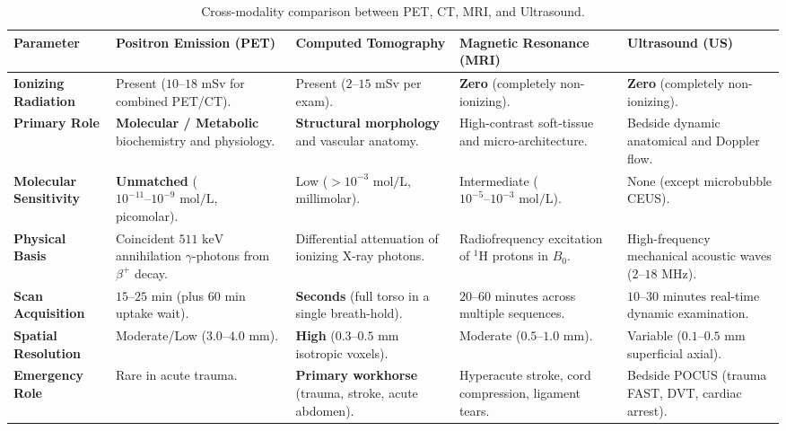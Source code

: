 \documentclass[11pt,a4paper]{article}
\begin{document}
\begin{table}[htbp]
\centering
\small
\setlength{\tabcolsep}{2.5pt}
\renewcommand{\arraystretch}{1.25}
\begin{tabular}{p{2.2cm}p{3.1cm}p{3.1cm}p{3.1cm}p{3.1cm}}
\toprule
\textbf{Parameter} & \textbf{Positron Emission (PET)} & \textbf{Computed Tomography} & \textbf{Magnetic Resonance (MRI)} & \textbf{Ultrasound (US)} \\
\midrule
\textbf{Ionizing Radiation} & Present ($10\text{--}18\text{ mSv}$ for combined PET/CT). & Present ($2\text{--}15\text{ mSv}$ per exam). & \textbf{Zero} (completely non-ionizing). & \textbf{Zero} (completely non-ionizing). \\
\textbf{Primary Role} & \textbf{Molecular / Metabolic} biochemistry and physiology. & \textbf{Structural morphology} and vascular anatomy. & High-contrast soft-tissue and micro-architecture. & Bedside dynamic anatomical and Doppler flow. \\
\textbf{Molecular Sensitivity} & \textbf{Unmatched} ($10^{-11}\text{--}10^{-9}\text{ mol/L}$, picomolar). & Low ($>10^{-3}\text{ mol/L}$, millimolar). & Intermediate ($10^{-5}\text{--}10^{-3}\text{ mol/L}$). & None (except microbubble CEUS). \\
\textbf{Physical Basis} & Coincident $511\text{ keV}$ annihilation $\gamma$-photons from $\beta^+$ decay. & Differential attenuation of ionizing X-ray photons. & Radiofrequency excitation of $^1\text{H}$ protons in $B_0$. & High-frequency mechanical acoustic waves ($2\text{--}18\text{ MHz}$). \\
\textbf{Scan Acquisition} & $15\text{--}25\text{ min}$ (plus $60\text{ min}$ uptake wait). & \textbf{Seconds} (full torso in a single breath-hold). & $20\text{--}60\text{ minutes}$ across multiple sequences. & $10\text{--}30\text{ minutes}$ real-time dynamic examination. \\
\textbf{Spatial Resolution} & Moderate/Low ($3.0\text{--}4.0\text{ mm}$). & \textbf{High} ($0.3\text{--}0.5\text{ mm}$ isotropic voxels). & Moderate ($0.5\text{--}1.0\text{ mm}$). & Variable ($0.1\text{--}0.5\text{ mm}$ superficial axial). \\
\textbf{Emergency Role} & Rare in acute trauma. & \textbf{Primary workhorse} (trauma, stroke, acute abdomen). & Hyperacute stroke, cord compression, ligament tears. & Bedside POCUS (trauma FAST, DVT, cardiac arrest). \\
\bottomrule
\end{tabular}
\caption{Cross-modality comparison between PET, CT, MRI, and Ultrasound.}
\label{tab:modality_comparison}
\end{table}
\end{document}
